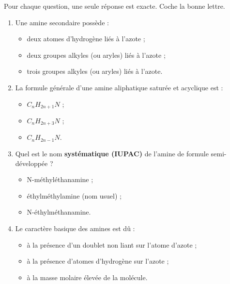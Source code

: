\documentclass[11pt]{article}
\begin{document}
\begin{exercice}
Pour chaque question, une seule réponse est exacte. Coche la bonne lettre.
\begin{enumerate}
\item Une amine secondaire possède :
\begin{itemize}
\item[\textbf{a)}] deux atomes d'hydrogène liés à l'azote ;
\item[\textbf{b)}] deux groupes alkyles (ou aryles) liés à l'azote ;
\item[\textbf{c)}] trois groupes alkyles (ou aryles) liés à l'azote.
\end{itemize}
\item La formule générale d'une amine aliphatique saturée et acyclique est :
\begin{itemize}
\item[\textbf{a)}] $C_nH_{2n+1}N$ ;
\item[\textbf{b)}] $C_nH_{2n+3}N$ ;
\item[\textbf{c)}] $C_nH_{2n-1}N$.
\end{itemize}
\item Quel est le nom \textbf{systématique (IUPAC)} de l'amine de formule semi-développée  ?
\begin{itemize}
\item[\textbf{a)}] N-méthyléthanamine ;
\item[\textbf{b)}] éthylméthylamine (nom usuel) ;
\item[\textbf{c)}] N-éthylméthanamine.
\end{itemize}
\item Le caractère basique des amines est dû :
\begin{itemize}
\item[\textbf{a)}] à la présence d'un doublet non liant sur l'atome d'azote ;
\item[\textbf{b)}] à la présence d'atomes d'hydrogène sur l'azote ;
\item[\textbf{c)}] à la masse molaire élevée de la molécule.
\end{itemize}
\end{enumerate}
\end{exercice}
\end{document}
